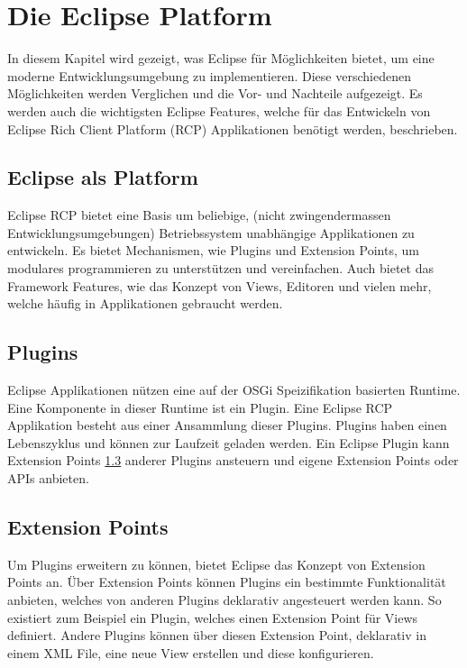 \chapter{Die Eclipse Platform}
\label{sec:EclipsePlatform}

In diesem Kapitel wird gezeigt, was Eclipse für Möglichkeiten bietet, um eine moderne Entwicklungsumgebung zu implementieren. Diese verschiedenen Möglichkeiten werden Verglichen und die Vor- und Nachteile aufgezeigt. Es werden auch die wichtigsten Eclipse Features, welche für das Entwickeln von Eclipse Rich Client Platform (RCP) Applikationen benötigt werden, beschrieben.

\section{Eclipse als Platform}

Eclipse RCP bietet eine Basis um beliebige, (nicht zwingendermassen Entwicklungsumgebungen) Betriebssystem unabhängige Applikationen zu entwickeln. Es bietet Mechanismen, wie Plugins und Extension Points, um modulares programmieren zu unterstützen und vereinfachen. Auch bietet das Framework Features, wie das Konzept von Views, Editoren und vielen mehr, welche häufig in Applikationen gebraucht werden.

\section{Plugins}

Eclipse Applikationen nützen eine auf der OSGi Speizifikation basierten Runtime. Eine Komponente in dieser Runtime ist ein Plugin. Eine Eclipse RCP Applikation besteht aus einer Ansammlung dieser Plugins.\cite{whatisaplugin} Plugins haben einen Lebenszyklus und können zur Laufzeit geladen werden. Ein Eclipse Plugin kann Extension Points \ref{extensionpointssection} anderer Plugins ansteuern und eigene Extension Points oder APIs anbieten.

\section{Extension Points}
\label{extensionpointssection}

Um Plugins erweitern zu können, bietet Eclipse das Konzept von Extension Points an. Über Extension Points können Plugins ein bestimmte Funktionalität anbieten, welches von anderen Plugins deklarativ angesteuert werden kann. 
\newline
So existiert zum Beispiel ein Plugin, welches einen Extension Point für Views definiert. Andere Plugins können über diesen Extension Point, deklarativ in einem XML File, eine neue View erstellen und diese konfigurieren. \cite{extensionpoints}


